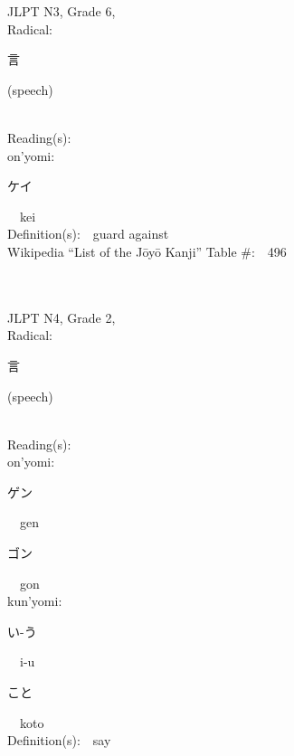 \begin{multicols}{2}
{JLPT N3, Grade 6, \\Radical:\ \ {\begin{CJK}{UTF8}{min} 言 \end{CJK}} (speech) } \\
Reading(s):\ \ \\
{\hspace*{1em}}on'yomi:\ \ \\
{\hspace*{2em}}{\begin{CJK}{UTF8}{min} ケイ \end{CJK}}\ \ kei\ \ \\
Definition(s):\ \ guard against \\
Wikipedia ``List of the J\=oy\=o Kanji'' Table \#:\ \ 496 \\
\ \ \\
{\fontsize{34pt}{40pt}  }\ \ \\  %
{JLPT N4, Grade 2, \\Radical:\ \ {\begin{CJK}{UTF8}{min} 言 \end{CJK}} (speech) } \\
Reading(s):\ \ \\
{\hspace*{1em}}on'yomi:\ \ \\
{\hspace*{2em}}{\begin{CJK}{UTF8}{min} ゲン \end{CJK}}\ \ gen\ \ \\
{\hspace*{2em}}{\begin{CJK}{UTF8}{min} ゴン \end{CJK}}\ \ gon\ \ \\
{\hspace*{1em}}kun'yomi:\ \ \\
{\hspace*{2em}}{\begin{CJK}{UTF8}{min} い-う \end{CJK}}\ \ i-u\ \ \\
{\hspace*{2em}}{\begin{CJK}{UTF8}{min} こと \end{CJK}}\ \ koto\ \ \\
Definition(s):\ \ say \\

\end{multicols}
